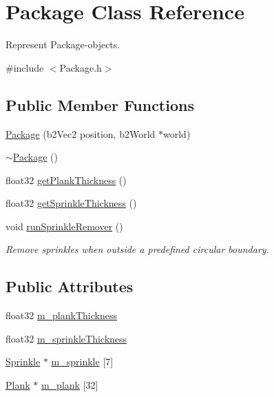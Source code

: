 \hypertarget{classPackage}{\section{Package Class Reference}
\label{classPackage}
}


Represent Package-\/objects.  




{\ttfamily \#include $<$Package.\-h$>$}

\subsection*{Public Member Functions}
\begin{DoxyCompactItemize}
\item 
\hyperlink{classPackage_a22b244832bfd2023aeefb40b9b53636e}{Package} (b2\-Vec2 position, b2\-World $\ast$world)
\item 
\hyperlink{classPackage_af9b48c577bb6045c2cbc97d09f76e973}{$\sim$\-Package} ()
\item 
float32 \hyperlink{classPackage_a0721952ecd3c3b61d5e12d2d32bb00f0}{get\-Plank\-Thickness} ()
\item 
float32 \hyperlink{classPackage_a9d32935ea281de4dc12986707a8db71f}{get\-Sprinkle\-Thickness} ()
\item 
void \hyperlink{classPackage_aa4e520d69f6a7d910bc917a8b2a4e2e2}{run\-Sprinkle\-Remover} ()
\begin{DoxyCompactList}\small\item\em Remove sprinkles when outside a predefined circular boundary. \end{DoxyCompactList}\end{DoxyCompactItemize}
\subsection*{Public Attributes}
\begin{DoxyCompactItemize}
\item 
float32 \hyperlink{classPackage_a9dd0955c53dc70f64c0dda77c82022bf}{m\-\_\-plank\-Thickness}
\item 
float32 \hyperlink{classPackage_a6c553d1b7c40cc277a141443789d1dcb}{m\-\_\-sprinkle\-Thickness}
\item 
\hyperlink{classSprinkle}{Sprinkle} $\ast$ \hyperlink{classPackage_a49c8135c0f0f1926e046c0fcd1904e68}{m\-\_\-sprinkle} \mbox{[}7\mbox{]}
\item 
\hyperlink{classPlank}{Plank} $\ast$ \hyperlink{classPackage_a3b902b5536530fd4f66e4cbb2a59fa6f}{m\-\_\-plank} \mbox{[}32\mbox{]}
\end{DoxyCompactItemize}


